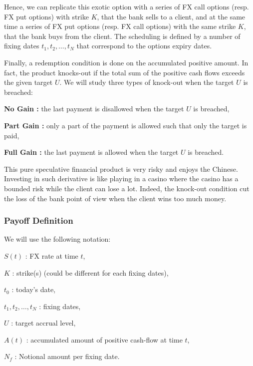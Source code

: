 Hence, we can replicate this exotic option with a series of FX call options (resp. FX put options) with strike $K$, that the bank sells to a client, and at the same time a series of FX put options (resp. FX call options) with the same strike $K$, that the bank buys from the client. The scheduling is defined by a number of fixing dates $t_1,t_2,\ldots,t_N$ that correspond to the options expiry dates.

Finally, a redemption condition is done on the accumulated positive amount. In fact, the product knocks-out if the total sum of the positive cash flows exceeds the given target $U$. We will study three types of knock-out when the target $U$ is breached:
\begin{my_list_item}
\item \textbf{No Gain :} the last payment is disallowed when the target $U$ is breached,
\item \textbf{Part Gain :} only a part of the payment is allowed such that only the target is paid,
\item \textbf{Full Gain :} the last payment is allowed when the target $U$ is breached. 
\end{my_list_item}

This pure speculative financial product is very risky and enjoys the Chinese. Investing in such derivative is like playing in a casino where the casino has a bounded risk while the client can lose a lot. Indeed, the knock-out condition cut the loss of the bank point of view when the client wins too much money.

\subsubsection*{Payoff Definition}
\label{sec:intro:Payoff}
We will use the following notation:
\begin{my_list_item}
\item $S(t)$ : FX rate at time $t$,
\item $K$ : strike(s) (could be different for each fixing dates),
\item $t_0$ : today's date,
\item $t_1,t_2,\ldots,t_N$ : fixing dates,
\item $U$ : target accrual level,
\item $A(t)$ : accumulated amount of positive cash-flow at time $t$,
\item $N_f$ : Notional amount per fixing date.
\end{my_list_item}

